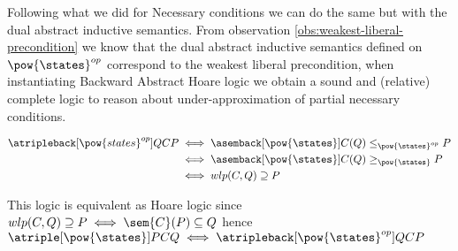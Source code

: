 Following what we did for Necessary conditions we can do the same but with the
dual abstract inductive semantics. From observation 
\ref{obs:weakest-liberal-precondition} we know that the dual abstract inductive 
semantics defined on $\pow{\states}^{op}$ correspond to the weakest liberal 
precondition, when instantiating Backward Abstract Hoare logic we obtain a sound
and (relative) complete logic to reason about under-approximation of partial 
necessary conditions.

\begin{align*}
  \atripleback[\pow{states}^{op}]{Q}{C}{P}
    & \iff \asemback[\pow{\states}]{C}(Q) \leq_{\pow{\states}^{op}} P \\
    & \iff \asemback[\pow{\states}]{C}(Q) \geq_{\pow{\states}} P \\
    & \iff wlp(C, Q) \supseteq P \\
\end{align*}

This logic is equivalent as Hoare logic since $wlp(C, Q) \supseteq P \iff 
\sem{C}(P) \subseteq Q$ hence $\atriple[\pow{\states}]{P}{C}{Q} \iff 
\atripleback[\pow{\states}^{op}]{Q}{C}{P}$


